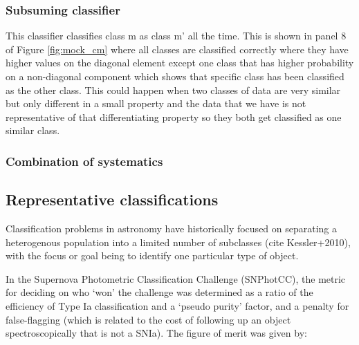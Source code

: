 \subsubsection{Subsuming classifier}
\label{sec:subsume_data}

This classifier classifies class m as class m' all the time.
This is shown in panel 8 of Figure \ref{fig:mock_cm}  where all classes are classified correctly where they have higher values on the diagonal element except one class that has higher probability on a non-diagonal component which shows that specific class has been classified as the other class.
This could happen when two classes of data are very similar but only different in a small property and the data that we have is not representative of that differentiating property so they both get classified as one similar class. 

\subsubsection{Combination of systematics}
\label{sec:combo}

\begin{figure}
	\begin{center}
		\caption{}
		\label{fig:combo_cm}
	\end{center}
\end{figure}

\subsection{Representative classifications}
\label{sec:realdata}



Classification problems in astronomy have historically focused on separating a heterogenous population into a limited number of subclasses (cite Kessler+2010), with the focus or goal being to identify one particular type of object.

In the Supernova Photometric Classification Challenge (SNPhotCC), the metric for deciding on who `won' the challenge was determined as a ratio of the efficiency of Type Ia classification and a `pseudo purity' factor, and a penalty for false-flagging (which is related to the cost of following up an object spectroscopically that is not a SNIa).
The figure of merit was given by:

